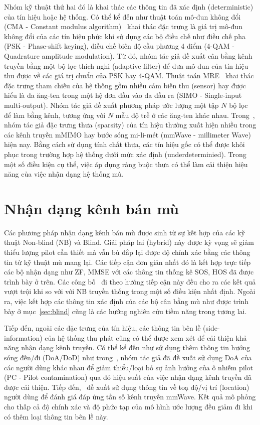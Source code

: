 Nhóm kỹ thuật thứ hai đó là khai thác các thông tin đã xác định (deterministic) của tín hiệu hoặc hệ thống. Có thể kể đến như thuật toán mô-đun không đổi (CMA - Constant modulus algorithm)~\cite{Treichler1983} khai thác đặc trưng là giá trị mô-đun không đổi của các tín hiệu phức khi sử dụng các bộ điều chế như điều chế pha (PSK - Phase-shift keying), điều chế biên độ cầu phương 4 điểm (4-QAM - Quadrature amplitude modulation). Từ đó, nhóm tác giả đề xuất cân bằng kênh truyền bằng một bộ lọc thích nghi (adaptive filter) để đưa mô-đun của tín hiệu thu được về các giá trị chuẩn của PSK hay 4-QAM. Thuật toán MRE~\cite{original} khai thác đặc trưng tham chiếu của hệ thống gồm nhiều cảm biến thu (sensor) hay được hiểu là đa ăng-ten trong một hệ đơn đầu vào đa đầu ra (SIMO - Single-input multi-output). Nhóm tác giả đề xuất phương pháp ước lượng một tập $N$ bộ lọc để làm bằng kênh, tương ứng với $N$ mẫu độ trễ ở các ăng-ten khác nhau. Trong~\cite{Bey2011}, nhóm tác giả đặc trưng thưa (sparsity) của tín hiệu thường xuất hiện nhiều trong các kênh truyền mMIMO hay bước sóng mi-li-mét (mmWave - millimeter Wave) hiện nay. Bằng cách sử dụng tính chất thưa, các tín hiệu gốc có thể được khôi phục trong trường hợp hệ thống dưới mức xác định (underdeterminied). Trong một số điều kiện cụ thể, việc áp dụng ràng buộc thưa có thể làm cải thiện hiệu năng của việc nhận dạng hệ thống mù.

\section{Nhận dạng kênh bán mù} \label{sec:semi}

Các phương pháp nhận dạng kênh bán mù được sinh từ sự kết hợp của các kỹ thuật Non-blind (NB) và Blind. Giải pháp lai (hybrid) này được kỳ vọng sẽ giảm thiểu lượng pilot cần thiết mà vẫn bù đắp lại được độ chính xác bằng các thông tin từ kỹ thuật mù mang lại. Các tiếp cận đơn giản nhất đó là kết hợp trực tiếp các bộ nhận dạng như ZF, MMSE với các thông tin thống kê SOS, HOS đã được trình bày ở trên. Các công bố~\cite{Wan2008, Ladaycia2019, Rekik2021} đi theo hướng tiếp cận này đều cho ra các kết quả vượt trội khi so với với NB truyền thống trong một số điều kiện nhất định. Ngoài ra, việc kết hợp các thông tin xác định của các bộ cân bằng mù như được trình bày ở mục~\ref{sec:blind} cũng là các hướng nghiên cứu tiềm năng trong tương lai.

Tiếp đến, ngoài các đặc trưng của tín hiệu, các thông tin bên lề (side-information) của hệ thống thu phát cũng có thể được xem xét để cải thiện khả năng nhận dạng kênh truyền. Có thể kể đến như sử dụng thêm thông tin hướng sóng đến/đi (DoA/DoD) như trong~\cite{Wang2016}, nhóm tác giả đã đề xuất sử dụng DoA của các người dùng khác nhau để giảm thiểu/loại bỏ sự ảnh hưởng của ô nhiễm pilot (PC - Pilot contamination) qua đó hiệu suất của việc nhận dạng kênh truyền đã được cải thiện. Tiếp đến,~\cite{Lin2020} đề xuất sử dụng thông tin về toạ độ/vị trí (location) người dùng để đánh giá đáp ứng tần số kênh truyền mmWave. Kết quả mô phỏng cho thấp cả độ chính xác và độ phức tạp của mô hình ước lượng đều giảm đi khi có thêm loại thông tin bên lề này.


